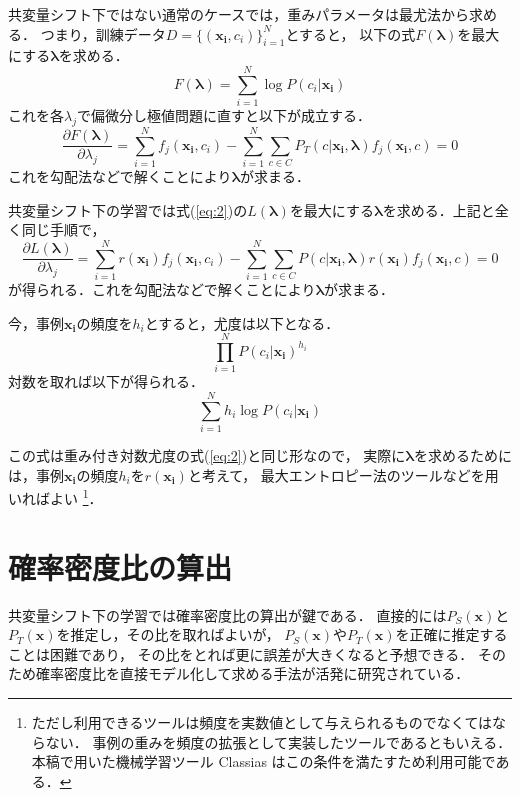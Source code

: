\documentclass[japanese]{jnlp_1.4}
\begin{document}
共変量シフト下ではない通常のケースでは，重みパラメータは最尤法から求める．
つまり，訓練データ\( D = \{(\boldsymbol{x_i},c_i)\}_{i=1}^N \)とすると，
以下の式\(  F(\boldsymbol{\lambda}) \)を最大にする\( \boldsymbol{\lambda} \)を求める．
\[
 F(\boldsymbol{\lambda}) = \sum_{i=1}^N \log P(c_i|\boldsymbol{x_i})
\]
これを各\( \lambda_j \)で偏微分し極値問題に直すと以下が成立する．
\[
\frac{\partial F(\boldsymbol{\lambda})}{\partial \lambda_j} =
\sum_{i=1}^N f_j (\boldsymbol{x_i},c_i) - 
\sum_{i=1}^N \sum_{c \in C} P_T(c|\boldsymbol{x_i},\boldsymbol{\lambda}) f_j(\boldsymbol{x_i},c) = 0
\]
これを勾配法などで解くことにより\( \boldsymbol{\lambda} \)が求まる．

共変量シフト下の学習では\mbox{式(\ref{eq:2})}の\( L(\boldsymbol{\lambda}) \)を最大にする\( \boldsymbol{\lambda} \)を求める．上記と全く同じ手順で，
\[
\frac{\partial L(\boldsymbol{\lambda})}{\partial \lambda_j} =
\sum_{i=1}^N r(\boldsymbol{x_i}) f_j (\boldsymbol{x_i},c_i) - 
\sum_{i=1}^N \sum_{c \in C} P(c|\boldsymbol{x_i},\boldsymbol{\lambda}) r(\boldsymbol{x_i}) f_j(\boldsymbol{x_i},c) = 0
\]
が得られる．これを勾配法などで解くことにより\( \boldsymbol{\lambda} \)が求まる．

今，事例\( \boldsymbol{x_i} \)の頻度を\( h_i \)とすると，尤度は以下となる．
\[
\prod_{i=1}^N P(c_i|\boldsymbol{x_i})^{h_i}
\]
対数を取れば以下が得られる．
\[
\sum_{i=1}^N h_i \log P(c_i|\boldsymbol{x_i})
\]

この式は重み付き対数尤度の\mbox{式(\ref{eq:2})}と同じ形なので，
実際に\( \boldsymbol{\lambda} \)を求めるためには，事例\( \boldsymbol{x_i} \)の頻度\( h_i \)を\( r(\boldsymbol{x_i}) \)と考えて，
最大エントロピー法のツールなどを用いればよい
\footnote{ただし利用できるツールは頻度を実数値として与えられるものでなくてはならない．
事例の重みを頻度の拡張として実装したツールであるともいえる．
本稿で用いた機械学習ツール Classias \cite{Classias}はこの条件を満たすため利用可能である．}．


\section{確率密度比の算出}


共変量シフト下の学習では確率密度比の算出が鍵である．
直接的には\( P_S(\boldsymbol{x}) \)と\( P_T(\boldsymbol{x}) \)を推定し，その比を取ればよいが，
\( P_S(\boldsymbol{x}) \)や\( P_T(\boldsymbol{x}) \)を正確に推定することは困難であり，
その比をとれば更に誤差が大きくなると予想できる．
そのため確率密度比を直接モデル化して求める手法が活発に研究されている\cite{sugiyama-2010}．
\end{document}
